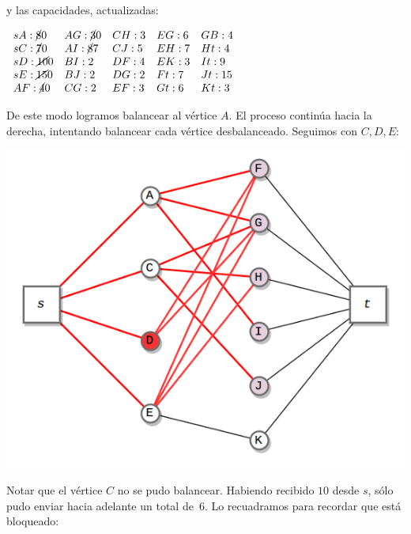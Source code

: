 \documentclass[10pt,a4paper]{article}
\begin{document}
y las capacidades, actualizadas:

\begin{center}
$\begin{array}{lllll} sA:\cancel{8} 0 & AG: \cancel{3}0 & CH: 3 & EG: 6 & GB:4\\ sC:\cancel{7 } 0 & AI: \cancel{8}7 & CJ: 5 & EH: 7 & Ht: 4\\ sD:\cancel{10} 0 & BI: 2 & DF:4 & EK: 3 & It: 9\\ sE: \cancel{15} 0 &BJ: 2 & DG: 2 & Ft: 7 & Jt: 15\\ AF: \cancel{4}0 & CG: 2 & EF: 3 & Gt: 6 & Kt: 3\\ \end{array}$
\end{center}

De este modo logramos balancear al vértice $A$. El proceso continúa hacia la derecha, intentando balancear cada vértice desbalanceado. Seguimos con $C, D, E$:

\begin{center}

    \begin{adjustbox}{max size={\textwidth}{\textheight}}
        \includegraphics{definitions/wave_4.jpg}
        \end{adjustbox}
    
\end{center}

Notar que el vértice $C$ no se pudo balancear. Habiendo recibido $10$ desde $s$, sólo pudo enviar hacia adelante un total de $6$. Lo recuadramos para recordar que está bloqueado:
\end{document}
